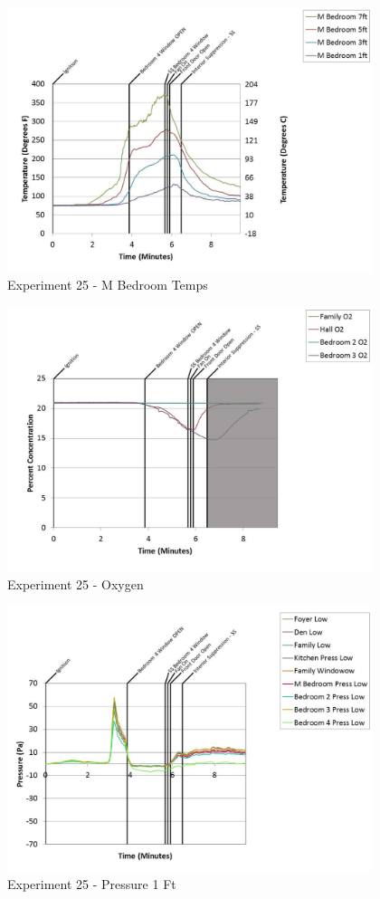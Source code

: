 \documentclass{article}
\begin{document}
\begin{appendices}
	\clearpage

	\begin{figure}[h!]
		\centering
		\includegraphics[height=3.05in]{0_Images/Results_Charts/Exp_25_Charts/MBedroomTemps.pdf}
		\caption{Experiment 25 - M Bedroom Temps}
	\end{figure}
 

	\begin{figure}[h!]
		\centering
		\includegraphics[height=3.05in]{0_Images/Results_Charts/Exp_25_Charts/Oxygen.pdf}
		\caption{Experiment 25 - Oxygen}
	\end{figure}
 
	\clearpage

	\begin{figure}[h!]
		\centering
		\includegraphics[height=3.05in]{0_Images/Results_Charts/Exp_25_Charts/Pressure1Ft.pdf}
		\caption{Experiment 25 - Pressure 1 Ft}
	\end{figure}
 


\end{appendices}
\end{document}
